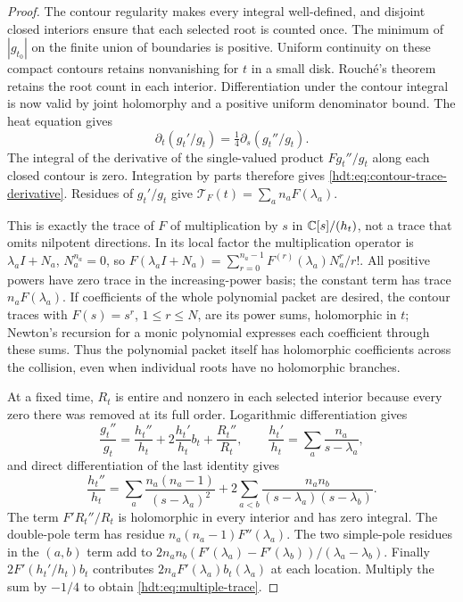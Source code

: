 \begin{proof}
The contour regularity makes every integral well-defined, and
disjoint closed interiors ensure that each selected root is counted
once. The minimum of $|g_{t_0}|$ on the finite union of boundaries is
positive. Uniform continuity on these compact contours retains
nonvanishing for $t$ in a small disk. Rouch\'e's theorem retains
the root count in each interior. Differentiation under the contour
integral is now valid by joint holomorphy and a positive uniform
denominator bound. The heat equation gives
\[
\partial_t(g_t'/g_t)
=\tfrac14\partial_s(g_t''/g_t).
\]
The integral of the derivative of the single-valued product
$F g_t''/g_t$ along each closed contour is zero. Integration by
parts therefore gives \eqref{hdt:eq:contour-trace-derivative}.
Residues of $g_t'/g_t$ give
$\mathscr T_F(t)=\sum_a n_aF(\lambda_a)$.

This is exactly the trace of $F$ of multiplication by $s$ in
$\mathbb C[s]/(h_t)$, not a trace that omits nilpotent directions.
In its local factor the multiplication operator is
$\lambda_a I+N_a$, $N_a^{n_a}=0$, so
$F(\lambda_a I+N_a)=\sum_{r=0}^{n_a-1}
F^{(r)}(\lambda_a)N_a^r/r!$.
All positive powers have zero trace in the increasing-power basis;
the constant term has trace $n_aF(\lambda_a)$.
If coefficients of the whole polynomial packet are desired, the
contour traces with $F(s)=s^r$, $1\leq r\leq N$, are its power
sums, holomorphic in $t$; Newton's recursion for a monic polynomial
expresses each coefficient through these sums. Thus the polynomial
packet itself has holomorphic coefficients across the collision,
even when individual roots have no holomorphic branches.

At a fixed time, $R_t$ is entire and nonzero in each selected
interior because every zero there was removed at its full order.
Logarithmic differentiation gives
\[
\frac{g_t''}{g_t}=\frac{h_t''}{h_t}
+2\frac{h_t'}{h_t}b_t+\frac{R_t''}{R_t},\qquad
\frac{h_t'}{h_t}=\sum_a\frac{n_a}{s-\lambda_a},
\]
and direct differentiation of the last identity gives
\[
\frac{h_t''}{h_t}
=\sum_a\frac{n_a(n_a-1)}{(s-\lambda_a)^2}
+2\sum_{a<b}\frac{n_an_b}{(s-\lambda_a)(s-\lambda_b)}.
\]
The term $F'R_t''/R_t$ is holomorphic in every interior and has
zero integral. The double-pole term has residue
$n_a(n_a-1)F''(\lambda_a)$. The two simple-pole residues in the
$(a,b)$ term add to
$2n_an_b(F'(\lambda_a)-F'(\lambda_b))/(\lambda_a-\lambda_b)$.
Finally $2F'(h_t'/h_t)b_t$ contributes
$2n_aF'(\lambda_a)b_t(\lambda_a)$ at each location.
Multiply the sum by $-1/4$ to obtain \eqref{hdt:eq:multiple-trace}.
\end{proof}

